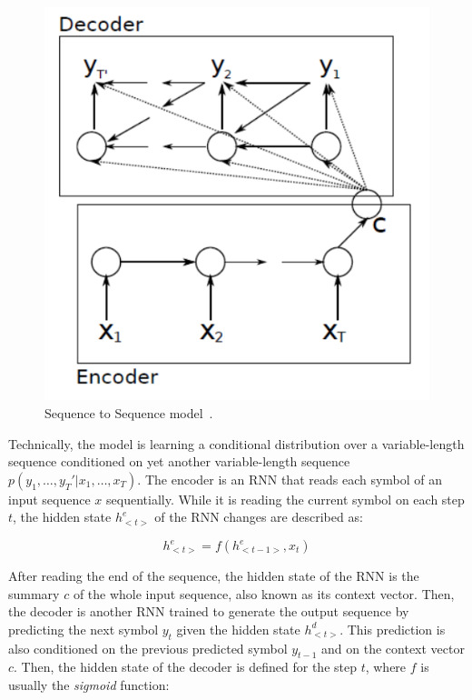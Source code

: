 \begin{figure}[!h]
    \centering
    \includegraphics[scale=.5]{imagenes/2_theorical_framework/semantic_parsing/seq2seqModel.PNG}
    \caption{Sequence to Sequence model~\cite{seqlab:Graves2012-385}.}
    \label{fig:seq2seqModel}
\end{figure}

Technically, the model is learning a conditional distribution over a variable-length sequence 
conditioned on yet another variable-length sequence $p(y_1,\ldots,y_T'|x_1,\ldots,x_T)$. The 
encoder is an RNN that reads each symbol of an input sequence $x$ sequentially. While it is 
reading the current symbol on each step $t$, the hidden state $h_{<t>}^e$ of the RNN changes are
described as:

\[
    h_{<t>}^e= f(h_{<t-1>}^e,x_t)
\]

After reading the end of the sequence, the hidden state of the RNN is the summary $c$ of the 
whole input sequence, also known as its context vector. Then, the decoder is another RNN 
trained to generate the output sequence by predicting the next symbol $y_t$ given the hidden 
state $h_{<t>}^d$. This prediction is also conditioned on the previous predicted symbol 
$y_{t-1}$ and on the context vector $c$. Then, the hidden state of the decoder is defined 
for the step $t$, where $f$ is usually the \textit{sigmoid} function:

